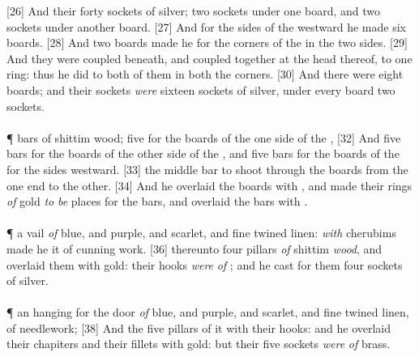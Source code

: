 [26] \textcolor[cmyk]{0.99998,1,0,0}{And their forty sockets of silver; two sockets under one board, and two sockets under another board.}
[27] \textcolor[cmyk]{0.99998,1,0,0}{And for the sides of the  westward he made six boards.}
[28] \textcolor[cmyk]{0.99998,1,0,0}{And two boards made he for the corners of the  in the two sides.}
[29] \textcolor[cmyk]{0.99998,1,0,0}{And they were coupled beneath, and coupled together at the head thereof, to one ring: thus he did to both of them in both the corners.}
[30] \textcolor[cmyk]{0.99998,1,0,0}{And there were eight boards; and their sockets \emph{were} sixteen sockets of silver, under every board two sockets.}\\
\\
\P \textcolor[cmyk]{0.99998,1,0,0}{ bars of shittim wood; five for the boards of the one side of the ,}
[32] \textcolor[cmyk]{0.99998,1,0,0}{And five bars for the boards of the other side of the , and five bars for the boards of the  for the sides westward.}
[33] \textcolor[cmyk]{0.99998,1,0,0}{ the middle bar to shoot through the boards from the one end to the other.}
[34] \textcolor[cmyk]{0.99998,1,0,0}{And he overlaid the boards with , and made their rings \emph{of} gold \emph{to} \emph{be} places for the bars, and overlaid the bars with .}\\
\\
\P \textcolor[cmyk]{0.99998,1,0,0}{ a vail \emph{of} blue, and purple, and scarlet, and fine twined linen: \emph{with} cherubims made he it of cunning work.}
[36] \textcolor[cmyk]{0.99998,1,0,0}{ thereunto four pillars \emph{of} shittim \emph{wood}, and overlaid them with gold: their hooks \emph{were} \emph{of} ; and he cast for them four sockets of silver.}\\
\\
\P \textcolor[cmyk]{0.99998,1,0,0}{ an hanging for the  door \emph{of} blue, and purple, and scarlet, and fine twined linen, of needlework;}
[38] \textcolor[cmyk]{0.99998,1,0,0}{And the five pillars of it with their hooks: and he overlaid their chapiters and their fillets with gold: but their five sockets \emph{were} \emph{of} brass.}